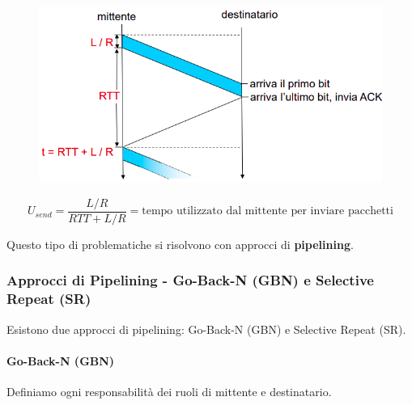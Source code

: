 \documentclass{article}
\begin{document}
\begin{figure}[htbp]
    \center
    \includegraphics[scale=0.52]{img/RDT3.0.png}
\end{figure}

\vspace*{-15px}

\[ \boxed{U_{send} = \frac{L/R}{RTT + L/R} = \text{tempo utilizzato dal mittente per inviare pacchetti} }\]

Questo tipo di problematiche si risolvono con approcci di \textbf{pipelining}.

\newpage

\subsubsection{Approcci di Pipelining - Go-Back-N (GBN) e Selective Repeat (SR)}

Esistono due approcci di pipelining: Go-Back-N (GBN) e Selective Repeat (SR).

\paragraph{Go-Back-N (GBN)} Definiamo ogni responsabilità dei ruoli di mittente e destinatario.
\end{document}

